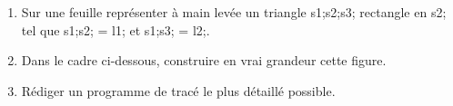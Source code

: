 \documentclass[exercice]{thedocument}%
\begin{document}
%
\begin{enumerate}
    \item Sur une feuille représenter à main levée un triangle
    \<s1;\<s2;\<s3; rectangle en {\<s2;} tel que \<s1;\<s2; = \<l1;
    et \<s1;\<s3; = \<l2;.
    \item Dans le cadre ci-dessous, construire en vrai grandeur cette figure.
    \item Rédiger un programme de tracé le plus détaillé possible.
\end{enumerate}
\begin{mdframed}
    \vspace{8cm}
\end{mdframed}
\end{document}
